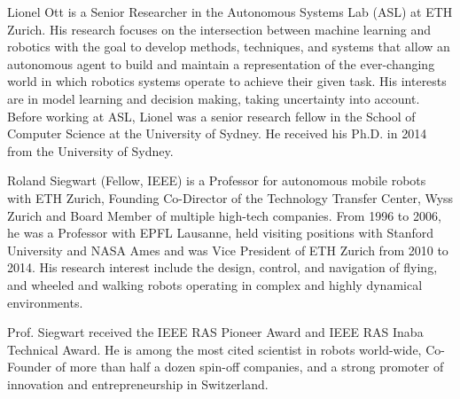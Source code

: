 \documentclass[journal]{IEEEtran}  %
\begin{document}
\begin{IEEEbiography}{Lionel Ott} is a Senior Researcher in the Autonomous Systems Lab (ASL) at ETH Zurich. His research focuses on the intersection between machine learning and robotics with the goal to develop methods, techniques, and systems that allow an autonomous agent to build and maintain a representation of the ever-changing world in which robotics systems operate to achieve their given task. His interests are in model learning and decision making, taking uncertainty into account. Before working at ASL, Lionel was a senior research fellow in the School of Computer Science at the University of Sydney. He received his Ph.D. in 2014 from the University of Sydney.
\end{IEEEbiography}

\begin{IEEEbiography}{Roland Siegwart}
(Fellow, IEEE) is a Professor for autonomous mobile robots with ETH Zurich, Founding Co-Director of the Technology Transfer Center, Wyss Zurich and Board Member of multiple high-tech companies. From 1996 to 2006, he was a Professor with EPFL Lausanne, held visiting positions with Stanford University and NASA Ames and was Vice President of ETH Zurich from 2010 to 2014. His research interest include the design, control, and navigation of flying, and wheeled and walking robots operating in complex and highly dynamical environments.

Prof. Siegwart received the IEEE RAS Pioneer Award and IEEE RAS Inaba Technical Award. He is among the most cited scientist in robots world-wide, Co-Founder of more than half a dozen spin-off companies, and a strong promoter of innovation and entrepreneurship in Switzerland.
\end{IEEEbiography}
\vfill
\end{document}
